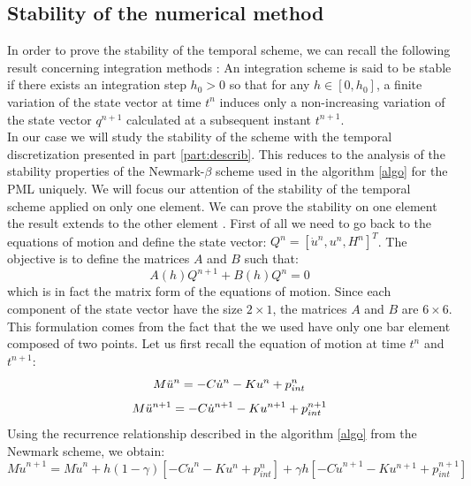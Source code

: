 \subsection{Stability of the numerical method}
In order to prove the stability of the temporal scheme, we can recall the following result concerning integration methods \cite{Geradin}: An integration scheme is said to be stable if there exists an integration step $h_0 > 0$ so that for any $h \in [0, h_0]$, a finite variation of the state vector at time $t^n$ induces only a non-increasing variation of the state vector $q^{n+1}$ calculated at a subsequent instant $t^{n+1}$.\\
In our case we will study the stability of the scheme with the temporal discretization presented in part \ref{part:describ}. This reduces to the analysis of the stability properties of the Newmark-$\beta$ scheme used in the algorithm \ref{algo} for the PML uniquely. We will focus our attention of the stability of the temporal scheme applied on only one element. We can prove the stability on one element the result extends to the other element \cite{Belytschko}. First of all we need to go back to the equations of motion and define the state vector: $Q^n = [\dot{u}^n, u^n, H^n]^T$.
The objective is to define the matrices $A$ and $B$ such that:
\begin{equation}
    A(h) Q^{n+1} + B(h) Q^{n} = 0
    \label{eq:matrix_form}
\end{equation}
which is in fact the matrix form of the equations of motion. Since each component of the state vector have the size $2 \times 1$, the matrices $A$ and $B$ are $6 \times 6$. This formulation comes from the fact that the we used have only one bar element composed of two points.    
Let us first recall the equation of motion at time $t^n$ and $t^{n+1}$:
\begin{equation}
    M  \Ddot{u}^n = -C \Dot{u}^n - K u^n +p_{int}^n 
\end{equation}
\begin{equation}
    M \Ddot{u}^{n+1} = -C \Dot{u}^{n+1} - K u^{n+1} +p_{int}^{n+1} 
\end{equation}
Using the recurrence relationship described in the algorithm \ref{algo} from the Newmark scheme, we obtain:
\begin{equation}
    M \dot{u}^{n+1} = M\Dot{u}^{n} + h(1-\gamma)\left[ -C \Dot{u}^n - K u^n +p_{int}^n   \right] + \gamma h \left[ -C \Dot{u}^{n+1} - K u^{n+1} +p_{int}^{n+1} \right]
    \label{eq:rec1}
\end{equation}

